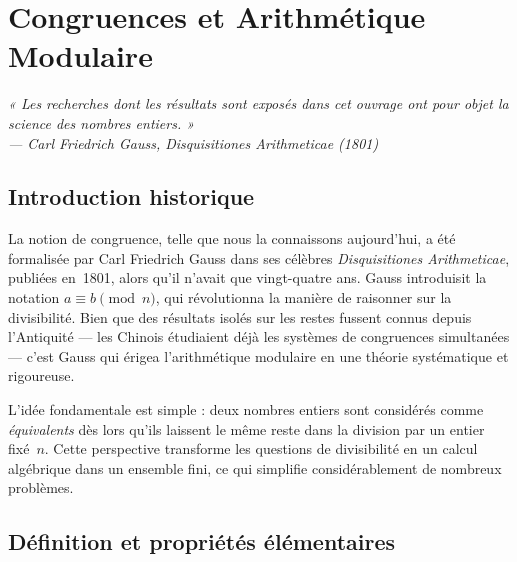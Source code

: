 \documentclass[12pt,a4paper,openany]{book}
\theoremstyle{definition}
\theoremstyle{plain}
\theoremstyle{remark}
\begin{document}
\chapter{Congruences et Arithmétique Modulaire}
\label{ch:congruences}

\vspace{-0.5em}
\begin{center}\itshape
  « Les recherches dont les résultats sont exposés dans cet ouvrage
  ont pour objet la science des nombres entiers. »\\[2pt]
  --- Carl Friedrich Gauss, \emph{Disquisitiones Arithmeticae} (1801)
\end{center}
\bigskip

\section{Introduction historique}
\label{sec:cong-hist}

La notion de congruence, telle que nous la connaissons
aujourd'hui, a été formalisée par Carl Friedrich Gauss
dans ses célèbres \emph{Disquisitiones Arithmeticae},
publiées en~1801, alors qu'il n'avait que vingt-quatre ans.
Gauss introduisit la notation $a \equiv b \pmod{n}$, qui révolutionna la manière
de raisonner sur la divisibilité. Bien que des résultats isolés sur les restes
fussent connus depuis l'Antiquité --- les Chinois étudiaient déjà les systèmes
de congruences simultanées --- c'est Gauss qui érigea l'arithmétique modulaire
en une théorie systématique et rigoureuse.

L'idée fondamentale est simple : deux nombres entiers sont considérés comme
\emph{équivalents} dès lors qu'ils laissent le même reste dans la division par
un entier fixé~$n$. Cette perspective transforme les questions de divisibilité
en un calcul algébrique dans un ensemble fini, ce qui simplifie considérablement
de nombreux problèmes.

\section{Définition et propriétés élémentaires}
\label{sec:cong-def}
\end{document}
